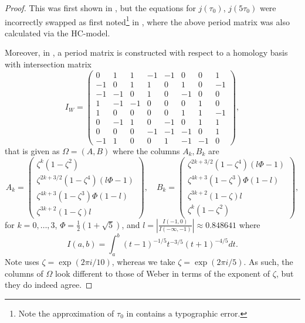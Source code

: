 \documentclass{amsart}
\begin{document}
\begin{proof}
This was first shown in \cite{Riera1992}, but the equations for $j(\tau_0)$, $j(5\tau_0)$ were incorrectly swapped as first noted\footnote{Note the approximation of $\tau_0$ in \cite{Braden2012} contains a typographic error.} in \cite{Braden2012}, where the above period matrix was also calculated via the HC-model. 

Moreover, in \cite{Weber2005}, a period matrix is constructed with respect to a homology basis with intersection matrix 
\[
I_W = \begin{pmatrix}
0 & 1 & 1 & -1 & -1 & 0 & 0 & 1 \\ -1 & 0 & 1 & 1 & 0 & 1 & 0 & -1 \\ -1 & -1 & 0 & 1 & 0 & -1 & 0 & 0 \\ 1 & -1 & -1 & 0 & 0 & 0 & 1 & 0 \\ 1 & 0 & 0 & 0 & 0 & 1 & 1 & -1 \\ 0 & -1 & 1 & 0 & -1 & 0 & 1 & 1 \\0 & 0 & 0 & -1 & -1 & -1 & 0 & 1 \\ -1 & 1 & 0 & 0 & 1 & -1 & -1 & 0 
\end{pmatrix}  , 
\]
that is given as $\Omega = (A, B)$ where the columns $A_k, B_k$ are 
\[
A_k = \begin{pmatrix} \zeta^{k} (1-\zeta^2) \\ \zeta^{2k+3/2}(1-\zeta^4)(l\Phi-1) \\ \zeta^{4k+3}(1-\zeta^3)\Phi(1-l) \\ \zeta^{3k+2}(1-\zeta)l \end{pmatrix}, \quad B_k = \begin{pmatrix}  \zeta^{2k+3/2}(1-\zeta^4)(l\Phi-1) \\ \zeta^{4k+3}(1-\zeta^3)\Phi(1-l) \\ \zeta^{3k+2}(1-\zeta)l \\ \zeta^{k} (1-\zeta^2) \end{pmatrix}  ,
\]
for $k=0, \dots, 3$, $\Phi = \frac{1}{2}(1+\sqrt{5})$, and $l = \left \lvert {\frac{I(-1,0)}{I(-\infty, -1)}} \right \rvert \approx 0.848641$ where 
\[
I(a,b) = \int_a^b (t-1)^{-1/5} t^{-3/5} (t+1)^{-4/5}  dt  . 
\]
Note \cite[Lemma 5.1]{Weber2005} uses $\zeta= \exp(2 \pi i/10)$, whereas we take $\zeta= \exp(2 \pi i/5)$. As such, the columns of $\Omega$ look different to those of Weber in terms of the exponent of $\zeta$, but they do indeed agree.


\end{proof}
\end{document}
